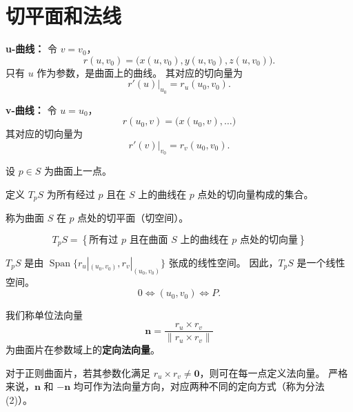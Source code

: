 \documentclass[lang=cn,10pt,thmcnt=section]{elegantbook}
\begin{document}
\section{切平面和法线}

  \textbf{u-曲线：} 令 $v = v_0$，
    $$
    r(u, v_0) = \big(x(u, v_0), y(u, v_0), z(u, v_0)\big).
    $$
    只有 $u$ 作为参数，是曲面上的曲线。
    其对应的切向量为
    $$
    \left. r'(u) \right|_{u_0} = r_u(u_0, v_0).
    $$
    
    \textbf{v-曲线：} 令 $u = u_0$，
    $$
    r(u_0, v) = \big(x(u_0, v), \ldots \big)
    $$
    其对应的切向量为
    $$
    \left. r'(v) \right|_{v_0} = r_v(u_0, v_0).
    $$
    \begin{definition}[切平面]
        设 $p \in S$ 为曲面上一点。
        
        定义 $T_p S$ 为所有经过 $p$ 且在 $S$ 上的曲线在 $p$ 点处的切向量构成的集合。
        
        称为曲面 $S$ 在 $p$ 点处的切平面（切空间）。
        
        $$
        T_p S = \left\{ \text{所有过 } p \text{ 且在曲面 } S \text{ 上的曲线在 } p \text{ 点处的切向量} \right\}
        $$
\end{definition}
\begin{proposition}
    $T_p S$ 是由 $\operatorname{Span}\{ r_u|_{(u_0,v_0)}, r_v|_{(u_0,v_0)} \}$ 张成的线性空间。  
因此，$T_p S$ 是一个线性空间。  
\[ 0 \iff (u_0, v_0) \iff P. \]
\end{proposition}
\begin{definition}[法向量与正则曲面片]
    我们称单位法向量
\[
\mathbf{n} = \frac{r_u \times r_v}{\lVert r_u \times r_v \rVert}
\]
为曲面片在参数域上的\textbf{定向法向量}。

对于正则曲面片，若其参数化满足 $r_u \times r_v \neq \mathbf{0}$，则可在每一点定义法向量。  
严格来说，$\mathbf{n}$ 和 $-\mathbf{n}$ 均可作为法向量方向，对应两种不同的定向方式（称为分法 (2)）。
\end{definition}
\end{document}
